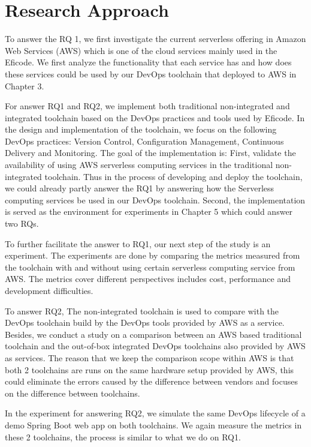 \section{Research Approach} 
\par
To answer the RQ 1, we first investigate the current serverless offering in Amazon Web Services (AWS) which is one of the cloud services mainly used in the Eficode. We first analyze the functionality that each service has and how does these services could be used by our DevOps toolchain that deployed to AWS in Chapter 3.
\par
For answer RQ1 and RQ2, we implement both traditional non-integrated and integrated toolchain based on the DevOps practices and tools used by Eficode. In the design and implementation of the toolchain, we focus on the following DevOps practices: Version Control, Configuration Management, Continuous Delivery and Monitoring. The goal of the implementation is: First, validate the availability of using AWS serverless computing services in the traditional non-integrated toolchain. Thus in the process of developing and deploy the toolchain, we could already partly answer the RQ1 by answering how the Serverless computing services be used in our DevOps toolchain. Second, the implementation is served as the environment for experiments in Chapter 5 which could answer two RQs.
\par
To further facilitate the answer to RQ1, our next step of the study is an experiment.
The experiments are done by comparing the metrics measured from the toolchain with and without using certain serverless computing service from AWS. The metrics cover different perspectives includes cost, performance and development difficulties. 
\par
To answer RQ2, The non-integrated toolchain is used to compare with the DevOps toolchain build by the DevOps tools provided by AWS as a service.
Besides, we conduct a study on a comparison between an AWS based traditional toolchain and the out-of-box integrated DevOps toolchains also provided by AWS as services. The reason that we keep the comparison scope within AWS is that both 2 toolchains are runs on the same hardware setup provided by AWS, this could eliminate the errors caused by the difference between vendors and focuses on the difference between toolchains.
\par
In the experiment for answering RQ2, we simulate the same DevOps lifecycle of a demo Spring Boot web app on both toolchains. We again measure the metrics in these 2 toolchains, the process is similar to what we do on RQ1.
